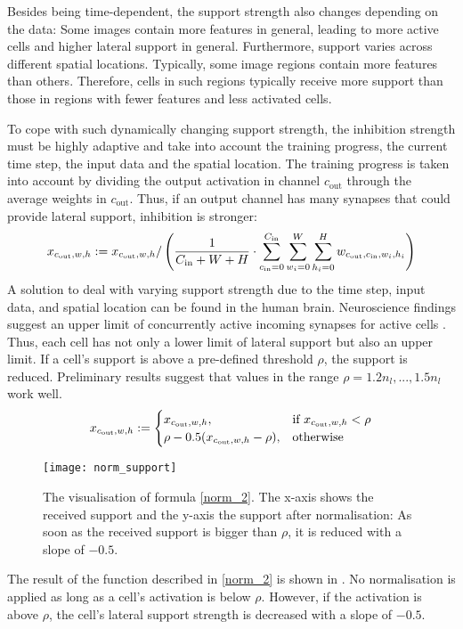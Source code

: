 Besides being time-dependent, the support strength also changes depending on the data:
Some images contain more features in general, leading to more active cells and higher lateral support in general. Furthermore, support varies across different spatial locations. Typically, some image regions contain more features than others. Therefore, cells in such regions typically receive more support than those in regions with fewer features and less activated cells.

To cope with such dynamically changing support strength, the inhibition strength must be highly adaptive and take into account the training progress, the current time step, the input data and the spatial location. 
The training progress is taken into account by dividing the output activation in channel $c_{\text{out}}$ through the average weights in $c_{\text{out}}$. Thus, if an output channel has many synapses that could provide lateral support, inhibition is stronger:
%
\begin{align}\eqlbl{norm_1}
    x_{c_{\text{out}},w,h} := x_{c_{\text{out}},w,h} / \left( \frac{1}{C_{\text{in}} + W + H} \cdot \sum_{c_{\text{in}}=0}^{C_{\text{in}}} \sum_{w_i=0}^{W} \sum_{h_i=0}^{H} w_{c_{\text{out}}, c_{\text{in}},w_i,h_i}  \right)
\end{align}
%
A solution to deal with varying support strength due to the time step, input data, and spatial location can be found in the human brain.
Neuroscience findings suggest an upper limit of concurrently active incoming synapses for active cells . Thus, each cell has not only a lower limit of lateral support but also an upper limit.
If a cell's support is above a pre-defined threshold $\rho$, the support is reduced.
Preliminary results suggest that values in the range $\rho = 1.2n_l, ..., 1.5n_l$ work well.
%
\begin{align}\eqlbl{norm_2}
	x_{c_{\text{out}},w,h} := \begin{cases}
      		x_{c_{\text{out}},w,h}, & \text{if } x_{c_{\text{out}},w,h} < \rho \\
      		\rho - 0.5(x_{c_{\text{out}},w,h} - \rho), & \text{otherwise}
    	\end{cases}
\end{align}
%
\begin{figure}[h]
    \centering
    \texttt{[image: norm\_support]}
    \caption[Inhibition for too many activated cells]{The visualisation of formula \eqref{norm_2}. The x-axis shows the received support and the y-axis the support after normalisation: As soon as the received support is bigger than $\rho$, it is reduced with a slope of $-0.5$.}
\end{figure}
The result of the function described in \eqref{norm_2} is shown in . No normalisation is applied as long as a cell's activation is below $\rho$. However, if the activation is above $\rho$, the cell's lateral support strength is decreased with a slope of $-0.5$.


